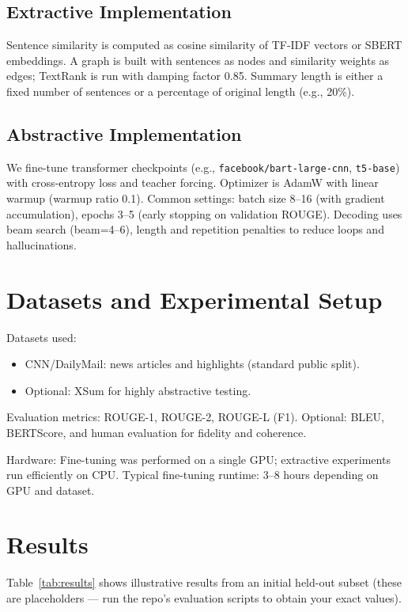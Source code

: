 \documentclass[11pt,a4paper]{article}
\begin{document}
\subsection{Extractive Implementation}
Sentence similarity is computed as cosine similarity of TF-IDF vectors or SBERT embeddings. A graph is built with sentences as nodes and similarity weights as edges; TextRank is run with damping factor 0.85. Summary length is either a fixed number of sentences or a percentage of original length (e.g., 20\%).

\subsection{Abstractive Implementation}
We fine-tune transformer checkpoints (e.g., \texttt{facebook/bart-large-cnn}, \texttt{t5-base}) with cross-entropy loss and teacher forcing. Optimizer is AdamW with linear warmup (warmup ratio 0.1). Common settings: batch size 8--16 (with gradient accumulation), epochs 3--5 (early stopping on validation ROUGE). Decoding uses beam search (beam=4--6), length and repetition penalties to reduce loops and hallucinations.

\section{Datasets and Experimental Setup}
Datasets used:
\begin{itemize}
    \item CNN/DailyMail: news articles and highlights (standard public split).
    \item Optional: XSum for highly abstractive testing.
\end{itemize}

Evaluation metrics:
ROUGE-1, ROUGE-2, ROUGE-L (F1). Optional: BLEU, BERTScore, and human evaluation for fidelity and coherence.

Hardware:
Fine-tuning was performed on a single GPU; extractive experiments run efficiently on CPU. Typical fine-tuning runtime: 3--8 hours depending on GPU and dataset.

\section{Results}
Table~\ref{tab:results} shows illustrative results from an initial held-out subset (these are placeholders — run the repo's evaluation scripts to obtain your exact values).
\end{document}
